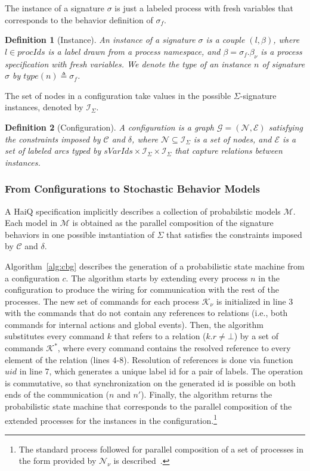 \documentclass[10pt,journal,compsoc]{IEEEtran}
\newtheorem{definition}{Definition}
\begin{document}
The instance of a signature $\sigma$ is just a labeled process with fresh variables that corresponds to the behavior definition of $\sigma_f$.
\begin{definition}[Instance] An instance of a signature $\sigma$ is a couple $(l, \beta)$, where $l \in procIds$ is a label drawn from a process namespace, and $\beta=\sigma_f.\beta_\nu$ is a process specification with fresh variables.
We denote the type of an instance $n$ of signature $\sigma$ by $type(n)\triangleq\sigma_f$.
\end{definition}
The set of nodes in a configuration take values in the possible $\Sigma$-signature instances, denoted by $\mathcal{I}_\Sigma$. 
\begin{definition}[Configuration] A configuration is a graph $\mathcal{G} = (\mathcal{N}, \mathcal{E})$ satisfying the constraints imposed by $\mathcal{C}$ and $\delta$, where $\mathcal{N} \subseteq \mathcal{I}_\Sigma$ is a set of nodes, and $\mathcal{E}$ is a set of labeled arcs typed by $sVarIds \times \mathcal{I}_\Sigma \times \mathcal{I}_\Sigma$ that capture relations between instances.
\end{definition}
\subsubsection{From Configurations to Stochastic Behavior Models}
\label{sec:csbm}
A {\sf HaiQ} specification implicitly describes a collection of probabilstic models $\mathcal{M}$. Each model in $\mathcal{M}$ is obtained as the parallel composition of the signature behaviors in one possible instantiation of $\Sigma$ that satisfies the constraints imposed by $\mathcal{C}$ and $\delta$.

Algorithm~\ref{alg:cbg} describes the generation of a probabilistic state machine from a configuration $c$. 
The algorithm starts by extending every process $n$ in the configuration to produce the wiring for communication with the rest of the processes. 
The new set of commands for each process $\mathcal{K}_\nu$  is initialized in line 3 with the commands that do not contain any references to relations (i.e., both commands for internal actions and global events).  
Then, the algorithm substitutes every command $k$ that refers to a relation ($k.r \neq \bot$) by a set of commands $\mathcal{K}^*$, where every command contains the resolved reference to every element of the relation (lines 4-8). 
Resolution of references is done via function $uid$ in line 7, which generates a unique label id for a pair of labels. The operation is commutative, so that synchronization on the generated id is possible on both ends of the communication ($n$ and $n'$). 
Finally, the algorithm returns the probabilistic state machine that corresponds to the parallel composition of the extended processes for the instances in the configuration.\footnote{The standard process followed for parallel composition of a set of processes in the form provided by $\mathcal{N}_\nu$ is described~\cite{prismsemantics}.} 
\end{document}

